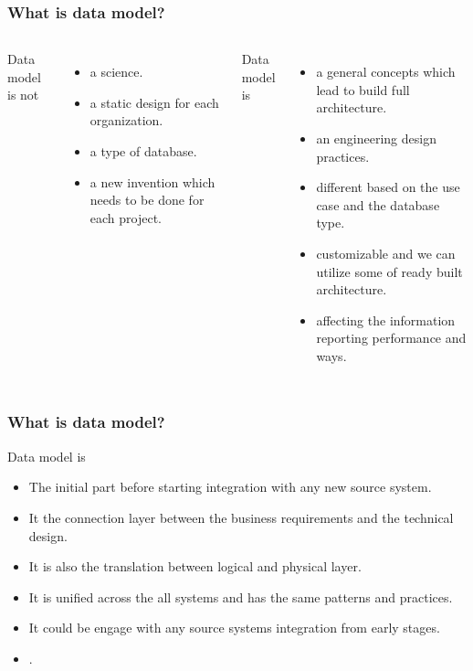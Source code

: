 \begin{frame}
\frametitle{What is data model?}

\begin{columns}

Data model is not	
\begin{itemize}[<+->]
	\item a science.
	\item a static design for each organization.
	\item a type of database.
	\item a new invention which needs to be done for each project. %
\end{itemize}


Data model is		
\begin{itemize}[<+->]
	\item a general concepts which lead to build full architecture.
	\item an engineering design practices.
	\item different based on the use case and the database type.
	\item customizable and we can utilize some of ready built architecture.
	\item affecting the information reporting performance and ways.
\end{itemize}

\end{columns}

\end{frame}


\begin{frame}
\frametitle{What is data model?}
Data model is
\begin{itemize}[<+->]
	\item The initial part before starting integration with any new source system.
	\item It the connection layer between the business requirements and the technical design.
	\item It is also the translation between logical and physical layer.
	\item It is unified across the all systems and has the same patterns and practices.
	\item It could be engage with any source systems integration from early stages.
	\item {}.
\end{itemize}
\end{frame}

